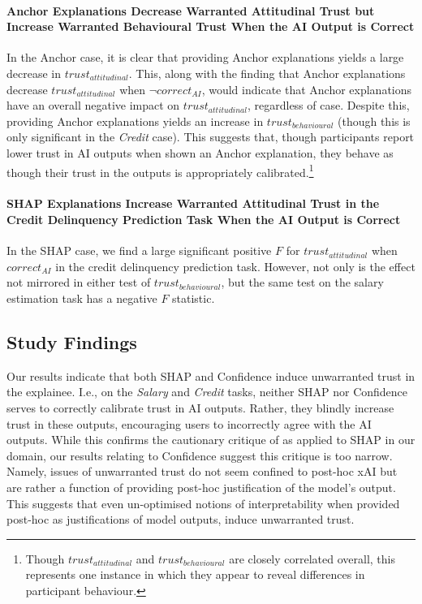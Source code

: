 \paragraph{Anchor Explanations Decrease Warranted Attitudinal Trust but Increase Warranted Behavioural Trust When the AI Output is Correct}
In the Anchor case, it is clear that providing Anchor explanations yields a large decrease in $trust_{attitudinal}$. This, along with the finding that Anchor explanations decrease $trust_{attitudinal}$ when $\neg correct_{AI}$, would indicate that Anchor explanations have an overall negative impact on $trust_{attitudinal}$, regardless of case. Despite this, providing Anchor explanations yields an increase in $trust_{behavioural}$ (though this is only significant in the \emph{Credit} case). This suggests that, though participants report lower trust in AI outputs when shown an Anchor explanation, they behave as though their trust in the outputs is appropriately calibrated.\footnote{Though $trust_{attitudinal}$ and $trust_{behavioural}$ are closely correlated overall, this represents one instance in which they appear to reveal differences in participant behaviour.}

\paragraph{SHAP Explanations Increase Warranted Attitudinal Trust in the Credit Delinquency Prediction Task When the AI Output is Correct}
In the SHAP case, we find a large significant positive $F$ for $trust_{attitudinal}$ when $correct_{AI}$ in the credit delinquency prediction task. However, not only is the effect not mirrored in either test of $trust_{behavioural}$, but the same test on the salary estimation task has a negative $F$ statistic.

\subsection{Study Findings}\label{ssec:os_discussion}
Our results indicate that both SHAP and Confidence induce unwarranted trust in the explainee. I.e., on the \emph{Salary} and \emph{Credit} tasks, neither SHAP nor Confidence serves to correctly calibrate trust in AI outputs. Rather, they blindly increase trust in these outputs, encouraging users to incorrectly agree with the AI outputs. While this confirms the cautionary critique of \textcite{Lipton} as applied to SHAP in our domain, our results relating to Confidence suggest this critique is too narrow. Namely, issues of unwarranted trust do not seem confined to post-hoc xAI but are rather a function of providing post-hoc justification of the model's output. This suggests that even un-optimised notions of interpretability when provided post-hoc as justifications of model outputs, induce unwarranted trust.


